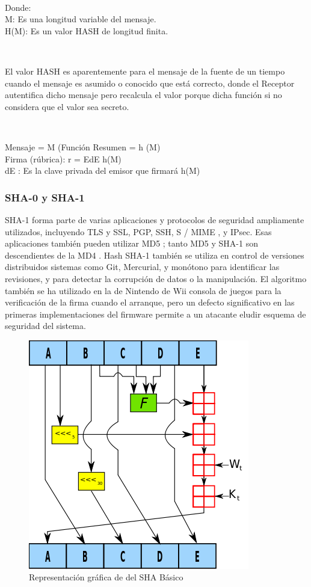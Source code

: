 \documentclass[11pt, conference]{IEEEtran}
\begin{document}
\

Donde:\\
M: Es una longitud variable del mensaje. \\
H(M): Es un valor HASH de longitud finita.

\

El valor HASH es aparentemente para el mensaje de la fuente de un tiempo cuando el mensaje es asumido o conocido que está correcto, donde el Receptor autentifica dicho mensaje pero recalcula el valor porque dicha función si no considera que el valor sea secreto.

\

Mensaje = M (Función Resumen = h (M) \\
Firma (rúbrica): r = EdE {h(M)} \\
dE : Es la clave privada del emisor que firmará h(M) \\

\subsubsection{SHA-0 y SHA-1}
SHA-1 forma parte de varias aplicaciones y protocolos de seguridad ampliamente utilizados, incluyendo TLS y SSL, PGP, SSH, S / MIME , y IPsec. Esas aplicaciones también pueden utilizar MD5 ; tanto MD5 y SHA-1 son descendientes de la MD4 . Hash SHA-1 también se utiliza en control de versiones distribuidos sistemas como Git, Mercurial, y monótono para identificar las revisiones, y para detectar la corrupción de datos o la manipulación. El algoritmo también se ha utilizado en la de Nintendo de Wii consola de juegos para la verificación de la firma cuando el arranque, pero un defecto significativo en las primeras implementaciones del firmware permite a un atacante eludir esquema de seguridad del sistema.


\begin{figure}[h]
	\centering
	\includegraphics[scale=0.5]{imagen_1.png} 
	\caption{Representación gráfica de del SHA Básico}
\end{figure}
\end{document}
